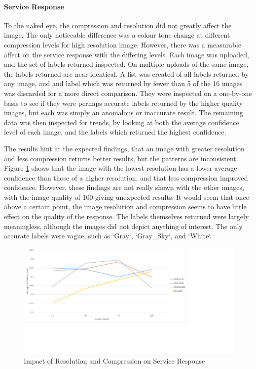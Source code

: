 \documentclass{article}
\begin{document}
\paragraph{Service Response}
To the naked eye, the compression and resolution did not greatly affect the image. The only noticeable difference was a colour tone change at different compression levels for high resolution image. However, there was a measurable affect on the service response with the differing levels. Each image was uploaded, and the set of labels returned inspected. On multiple uploads of the same image, the labels returned are near identical. A list was created of all labels returned by any image, and and label which was returned by fewer than 5 of the 16 images was discarded for a more direct comparison. They were inspected on a one-by-one basis to see if they were perhaps accurate labels returned by the higher quality images, but each was simply an anomalous or inaccurate result. The remaining data was then inspected for trends, by looking at both the average confidence level of each image, and the labels which returned the highest confidence. 

The results hint at the expected findings, that an image with greater resolution and less compression returns better results, but the patterns are inconsistent. Figure \ref{fig:ImageResImpact} shows that the image with the lowest resolution has a lower average confidence than those of a higher resolution, and that less compression improved confidence. However, these findings are not really shown with the other images, with the image quality of 100 giving unexpected results. It would seem that once above a certain point, the image resolution and compression seems to have little effect on the quality of the response. The labels themselves returned were largely meaningless, although the images did not depict anything of interest. The only accurate labels were vague, such as `Gray`, `Gray\_Sky`, and `White`.  

\begin{figure}[h]
\caption{Impact of Resolution and Compression on Service Response\label{fig:ImageResImpact}}
\includegraphics[width=\textwidth]{ImageResImpact}
\end{figure}
\end{document}

